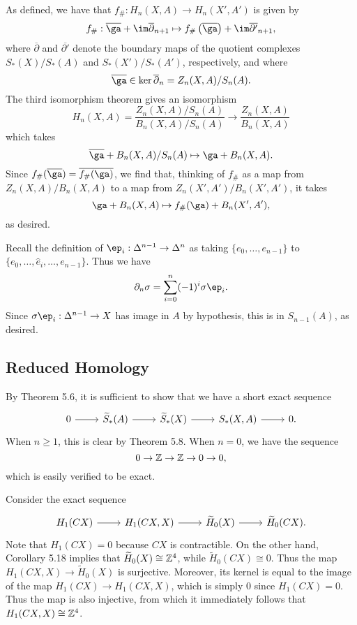 \documentclass[../../solutions.tex]{subfiles}
\begin{document}
\begin{exercise} \leavevmode
As defined, we have that $f_\#:H_n(X,A)\to H_n(X',A')$ is given by \[f_\#:\overline\ga+\im\overline\partial_{n+1}\mapsto f_\#\left(\overline\ga\right)+\im\overline{\partial'}_{n+1},\] where $\overline\partial$ and $\overline{\partial'}$ denote the boundary maps of the quotient complexes $S_*(X)/S_*(A)$ and $S_*(X')/S_*(A')$, respectively, and where \[\overline\ga\in\ker\overline\partial_n=Z_n(X,A)/S_n(A).\] 
The third isomorphism theorem gives an isomorphism \[H_n(X,A)=\frac{Z_n(X,A)/S_n(A)}{B_n(X,A)/S_n(A)}\to\frac{Z_n(X,A)}{B_n(X,A)}\] which takes \[\overline\ga+B_n(X,A)/S_n(A)\mapsto\ga+B_n(X,A).\] 
Since $f_\#(\overline\ga)=\overline{f_\#(\ga)}$, we find that, thinking of $f_\#$ as a map from $Z_n(X,A)/B_n(X,A)$ to a map from $Z_n(X',A')/B_n(X',A')$, it takes \[\ga+B_n(X,A)\mapsto f_\#(\ga)+B_n(X',A'),\] as desired.
\end{exercise}

\begin{exercise} \leavevmode
Recall the definition of $\ep_i:\Delta^{n-1}\to\Delta^n$ as taking $\{e_0,\dots,e_{n-1}\}$ to $\{e_0,\dots,\hat e_i,\dots,e_{n-1}\}$. 
Thus we have \[\partial_n\sig=\sum_{i=0}^n(-1)^i\sig\ep_i.\]
Since $\sig\ep_i:\Delta^{n-1}\to X$ has image in $A$ by hypothesis, this is in $S_{n-1}(A)$, as desired. 
\end{exercise}

\subsection{Reduced Homology}
\begin{exercise} \leavevmode
By Theorem 5.6, it is sufficient to show that we have a short exact sequence \[\begin{tikzcd}0\ar[r] & \widetilde S_*(A)\ar[r] & \widetilde S_*(X)\ar[r] & S_*(X,A)\ar[r] & 0.\end{tikzcd}\]
When $n\ge1$, this is clear by Theorem 5.8. 
When $n=0$, we have the sequence \[0\to\mathbb{Z}\to\mathbb{Z}\to0\to0,\] which is easily verified to be exact. 
\end{exercise}

\begin{exercise} \leavevmode
Consider the exact sequence \[\begin{tikzcd}H_1(CX)\ar[r] & H_1(CX,X)\ar[r] & \widetilde H_0(X)\ar[r] & \widetilde H_0(CX).\end{tikzcd}\]
Note that $H_1(CX)=0$ because $CX$ is contractible.
On the other hand, Corollary 5.18 implies that $\widetilde H_0(X)\cong\mathbb{Z}^4$, while $\widetilde H_0(CX)\cong0$. 
Thus the map $H_1(CX,X)\to\widetilde H_0(X)$ is surjective.
Moreover, its kernel is equal to the image of the map $H_1(CX)\to H_1(CX,X)$, which is simply 0 since $H_1(CX)=0$. 
Thus the map is also injective, from which it immediately follows that $H_1(CX,X)\cong\mathbb{Z}^4$. 
\end{exercise}
\end{document}
